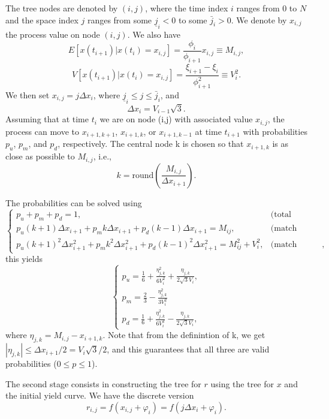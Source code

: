 The tree nodes are denoted by $(i,j)$, where the time index $i$ ranges from 
0 to $N$ and the space index $j$ ranges from some $\underline{j}_i < 0$ to 
some $\bar{j}_i>0$. We denote by $x_{i,j}$ the process value on node
$(i,j)$. We also have
\[
  E[x(t_{i+1})|x(t_i)=x_{i,j}] = \frac{\phi_i}{\phi_{i+1}} x_{i,j} \equiv
M_{i,j},
\]
\[
  V[x(t_{i+1})|x(t_i)=x_{i,j}] = \frac{\xi_{i+1}-\xi_i}{\phi_{i+1}^2} 
                   \equiv V_i^2.
\]
We then set $x_{i,j}=j \Delta x_i$, where 
$\underline{j}_i \leq j \leq \bar{j}_i$, and
\[
  \Delta x_i = V_{i-1} \sqrt{3}.
\]
Assuming that at time $t_i$ we are on node (i,j) with associated value
$x_{i,j}$, the process can move to $x_{i+1,k+1}$, $x_{i+1,k}$, or 
$x_{i+1,k-1}$ at time $t_{i+1}$ with probabilities $p_u$, $p_m$,
and $p_d$, respectively. The central node k is chosen so that
$x_{i+1,k}$ is as close as possible to $M_{i,j}$, i.e.,
\[
  k = \text{round} \left( \frac{M_{i,j}}{\Delta x_{i+1}}   \right).
\]

The probabilities can be solved using
\[
  \begin{cases}
    p_u + p_m + p_d = 1,      &\text{(total probability)} \\
    p_u (k+1) \Delta x_{i+1} + p_m k \Delta x_{i+1} + p_d (k-1) \Delta x_{i+1} 
      = M_{ij},               &\text{(match mean)}  \\
    p_u (k+1)^2 \Delta x_{i+1}^2 + p_m k^2 \Delta x_{i+1}^2 
      + p_d (k-1)^2 \Delta x_{i+1}^2 = M_{ij}^2 + V_i^2, 
      &\text{(match variance)},
  \end{cases}
\]
this yields
\[
  \begin{cases}
    p_u = \frac{1}{6} + \frac{\eta_{j,k}^2}{6 V_i^2} 
          + \frac{\eta_{j,k}}{2 \sqrt{3} V_i},  \\
    p_m = \frac{2}{3} - \frac{\eta_{j,k}^2}{3 V_i^2}  \\
    p_d = \frac{1}{6} + \frac{\eta_{j,k}^2}{6V_i^2} 
          - \frac{\eta_{j,k}}{2 \sqrt{3} V_i},
  \end{cases}
\]
where $\eta_{j,k}=M_{i,j}-x_{i+1,k}$. Note that from the definintion of k,
we get $|\eta_{j,k}|\leq \Delta x_{i+1}/2 = V_i \sqrt{3} /2$, and this
guarantees that all three are valid probabilities ($0\leq p \leq 1$).

The second stage consists in constructing the tree for $r$ using the tree for 
$x$ and the initial yield curve. 
We have the discrete version
\[
  r_{i,j} = f(x_{i,j} + \varphi_i) = f(j \Delta x_i + \varphi_i).
\]

